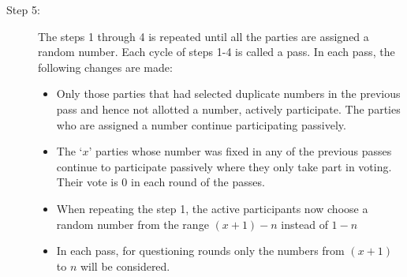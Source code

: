 \documentclass{llncs}
\begin{document}
\begin{description}
 \item[Step 5:]\hspace{2mm} The steps 1 through 4 is repeated until all the parties are assigned a random number. Each cycle of steps 1-4 is called a pass. In each pass, the following changes are made:
 \begin{itemize}
 \item Only those parties that had selected duplicate numbers in the previous pass and hence not allotted a number, actively participate. The parties who are assigned a number continue participating passively.
 \item The $‘x’$ parties whose number was fixed in any of the previous passes continue to participate passively where they only take part in voting. Their vote is 0 in each round of the passes.
 \item When repeating the step 1, the active participants now choose a random number from the range $(x+1) - n$ instead of $1-n$
 \item In each pass, for questioning rounds only the numbers from $(x+1)$ to $n$ will be considered.
 \end{itemize}
\end{description}
\end{document}
